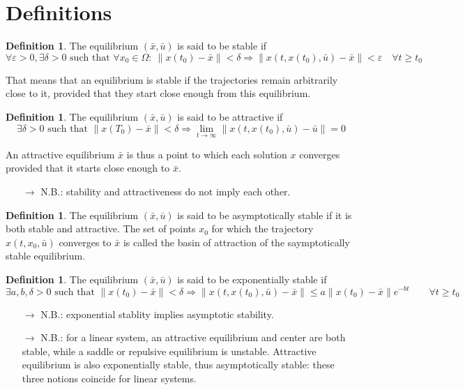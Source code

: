 \documentclass[12pt, openany]{report}
\theoremstyle{definition}
\newtheorem{definition}[thm]{Definition}
\begin{document}
\section{Definitions}
\begin{definition}
    The equilibrium \((\bar x,\bar u)\) is said to be stable if \begin{equation}
        \forall \varepsilon>0, \exists \delta>0 \text{ such that } \forall x_0\in \Omega:\: \lVert x(t_0)-\bar x\rVert <\delta \Longrightarrow \lVert x(t,x(t_0), \bar u)-\bar x\rVert<\varepsilon \quad \forall t\ge t_0
    \end{equation}
\end{definition}
That means that an equilibrium is stable if the trajectories remain arbitrarily close to it, provided that they start close enough from this equilibrium. 
\begin{definition}
    The equilibrium \((\bar x,\bar u)\) is said to be attractive if \begin{equation}
        \exists \delta >0\text{ such that } \lVert x(T_0)-\bar x\rVert <\delta \Longrightarrow \lim_{t\rightarrow \infty} \lVert x(t,x(t_0),\bar u)-\bar u\rVert=0
    \end{equation}
\end{definition}
An attractive equilibrium \(\bar x\) is thus a point to which each solution \(x\) converges provided that it starts close enough to \(\bar x\). 
\begin{itemize}
    \item [\(\rightarrow\)] N.B.: stability and attractiveness do not imply each other.
\end{itemize}
\begin{definition}
    The equilibrium \((\bar x,\bar u)\) is said to be asymptotically stable if it is both stable and attractive. The set of points \(x_0\) for which the trajectory \(x(t,x_0, \bar u)\) converges to \(\bar x\) is called the basin of attraction of the saymptotically stable equilibrium. 
\end{definition}
\begin{definition}
    The equilibrium \((\bar x,\bar u)\) is said to be exponentially stable if \begin{equation}
        \exists a,b,\delta>0 \text{ such that }\lVert x(t_0)-\bar x\rVert <\delta \Longrightarrow \lVert x(t,x(t_0),\bar u)-\bar x\rVert \le a\lVert x(t_0)-\bar x\rVert e^{-bt}\qquad \forall t\ge t_0
    \end{equation}
\end{definition}
\begin{itemize}
    \item [\(\rightarrow\)] N.B.: exponential stablity implies asymptotic stability.
    \item [\(\rightarrow\)] N.B.: for a linear system, an attractive equilibrium and center are both stable, while a saddle or repulsive equilibrium is unstable. Attractive equilibrium is also exponentially stable, thus asymptotically stable: these three notions coincide for linear systems. 
\end{itemize}
\end{document}
